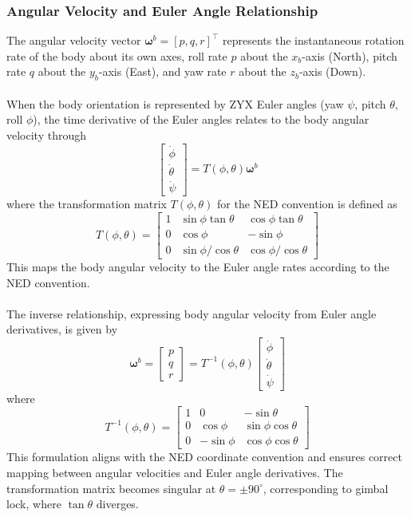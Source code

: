 \subsubsection{Angular Velocity and Euler Angle Relationship}
The angular velocity vector $\boldsymbol{\omega}^b = [p, q, r]^\top$ represents the instantaneous rotation rate of the body about its own axes, roll rate $p$ about the $x_b$-axis (North), pitch rate $q$ about the $y_b$-axis (East), and yaw rate $r$ about the $z_b$-axis (Down).  
\\ \\
When the body orientation is represented by ZYX Euler angles (yaw $\psi$, pitch $\theta$, roll $\phi$), the time derivative of the Euler angles relates to the body angular velocity through
$$
    \begin{bmatrix}
        \dot{\phi} \\ \dot{\theta} \\ \dot{\psi}
    \end{bmatrix}
    = T(\phi, \theta)\boldsymbol{\omega}^b
$$
where the transformation matrix $T(\phi, \theta)$ for the NED convention is defined as
$$
    T(\phi, \theta) =
    \begin{bmatrix}
        1 & \sin\phi\tan\theta & \cos\phi\tan\theta \\
        0 & \cos\phi & -\sin\phi \\
        0 & \sin\phi/\cos\theta & \cos\phi/\cos\theta
    \end{bmatrix}
$$
This maps the body angular velocity to the Euler angle rates according to the NED convention.  
\\ \\
The inverse relationship, expressing body angular velocity from Euler angle derivatives, is given by
$$
    \boldsymbol{\omega}^b =
    \begin{bmatrix}
        p \\ q \\ r
    \end{bmatrix}
    = T^{-1}(\phi, \theta)
    \begin{bmatrix}
        \dot{\phi} \\ \dot{\theta} \\ \dot{\psi}
    \end{bmatrix}
$$
where
$$
    T^{-1}(\phi, \theta) =
    \begin{bmatrix}
        1 & 0 & -\sin\theta \\
        0 & \cos\phi & \sin\phi\cos\theta \\
        0 & -\sin\phi & \cos\phi\cos\theta
    \end{bmatrix}
$$
This formulation aligns with the NED coordinate convention and ensures correct mapping between angular velocities and Euler angle derivatives. The transformation matrix becomes singular at $\theta = \pm 90^\circ$, corresponding to gimbal lock, where $\tan\theta$ diverges.  



